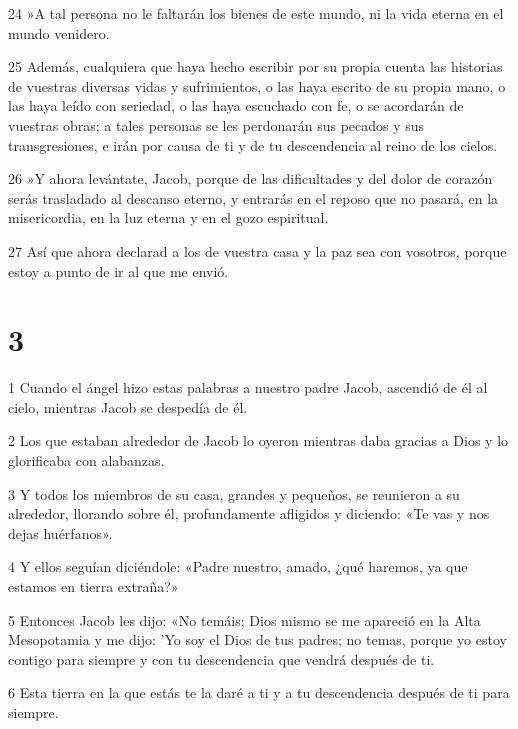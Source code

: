 \par 24 »A tal persona no le faltarán los bienes de este mundo, ni la vida eterna en el mundo venidero.

\par 25 Además, cualquiera que haya hecho escribir por su propia cuenta las historias de vuestras diversas vidas y sufrimientos, o las haya escrito de su propia mano, o las haya leído con seriedad, o las haya escuchado con fe, o se acordarán de vuestras obras; a tales personas se les perdonarán sus pecados y sus transgresiones, e irán por causa de ti y de tu descendencia al reino de los cielos.

\par 26 »Y ahora levántate, Jacob, porque de las dificultades y del dolor de corazón serás trasladado al descanso eterno, y entrarás en el reposo que no pasará, en la misericordia, en la luz eterna y en el gozo espiritual.

\par 27 Así que ahora declarad a los de vuestra casa y la paz sea con vosotros, porque estoy a punto de ir al que me envió.

\chapter{3}

\par 1 Cuando el ángel hizo estas palabras a nuestro padre Jacob, ascendió de él al cielo, mientras Jacob se despedía de él.

\par 2 Los que estaban alrededor de Jacob lo oyeron mientras daba gracias a Dios y lo glorificaba con alabanzas.

\par 3 Y todos los miembros de su casa, grandes y pequeños, se reunieron a su alrededor, llorando sobre él, profundamente afligidos y diciendo: «Te vas y nos dejas huérfanos».

\par 4 Y ellos seguían diciéndole: «Padre nuestro, amado, ¿qué haremos, ya que estamos en tierra extraña?»

\par 5 Entonces Jacob les dijo: «No temáis; Dios mismo se me apareció en la Alta Mesopotamia y me dijo: 'Yo soy el Dios de tus padres; no temas, porque yo estoy contigo para siempre y con tu descendencia que vendrá después de ti.

\par 6 Esta tierra en la que estás te la daré a ti y a tu descendencia después de ti para siempre.

